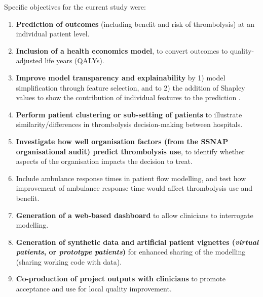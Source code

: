Specific objectives for the current study were:

\begin{enumerate}

    \item \textbf{Prediction of outcomes} (including benefit and risk of thrombolysis) at an individual patient level.

    \item \textbf{Inclusion of a health economics model}, to convert outcomes to quality-adjusted life years (QALYs).

    \item \textbf{Improve model transparency and explainability} by 1) model simplification through feature selection, and to 2) the addition of Shapley values to show the contribution of individual features to the prediction \cite{aas_explaining_2020}.

    \item \textbf{Perform patient clustering or sub-setting of patients} to illustrate similarity/differences in thrombolysis decision-making between hospitals.

    \item \textbf{Investigate how well organisation factors (from the SSNAP organisational audit) predict thrombolysis use}, to identify whether aspects of the organisation impacts the decision to treat.

    \item Include ambulance response times in patient flow modelling, and test how improvement of ambulance response time would affect thrombolysis use and benefit.

    \item \textbf{Generation of a web-based dashboard} to allow clinicians to interrogate modelling.

    \item \textbf{Generation of synthetic data and artificial patient vignettes (\textit{virtual patients}, or \textit{prototype patients})} for enhanced sharing of the modelling (sharing working code with data).

    \item \textbf{Co-production of project outputs with clinicians} to promote acceptance and use for local quality improvement.
    
\end{enumerate}